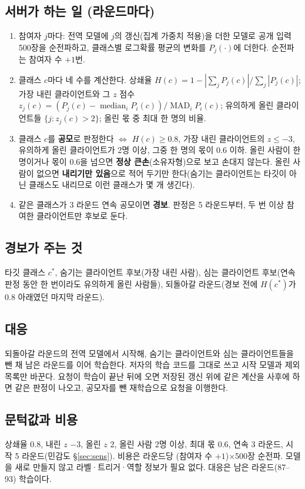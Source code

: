 \documentclass[10pt,a4paper]{article}
\begin{document}
\subsection{서버가 하는 일 (라운드마다)}
\begin{enumerate}
\item 참여자 $j$마다: 전역 모델에 $j$의 갱신(집계 가중치 적용)을 더한 모델로 공개 입력 500장을 순전파하고, 클래스별 로그확률 평균의 변화를 $P_j(\cdot)$에 더한다. 순전파는 참여자 수 $+1$번.
\item 클래스 $c$마다 네 수를 계산한다. 상쇄율 $H(c)=1-|\sum_jP_j(c)|/\sum_j|P_j(c)|$; 가장 내린 클라이언트와 그 $z$ 점수 $z_j(c)=(P_j(c)-\operatorname{median}_iP_i(c))/\operatorname{MAD}_iP_i(c)$; 유의하게 올린 클라이언트들 $\{j: z_j(c)>2\}$; 올린 몫 중 최대 한 명의 비율.
\item 클래스 $c$를 \textbf{공모}로 판정한다 $\Leftrightarrow$ $H(c)\ge0.8$, 가장 내린 클라이언트의 $z\le-3$, 유의하게 올린 클라이언트가 2명 이상, 그중 한 명의 몫이 0.6 이하. 올린 사람이 한 명이거나 몫이 0.6을 넘으면 \textbf{정상 큰손}(소유자형)으로 보고 손대지 않는다. 올린 사람이 없으면 \textbf{내리기만 있음}으로 적어 두기만 한다(숨기는 클라이언트는 타깃이 아닌 클래스도 내리므로 이런 클래스가 몇 개 생긴다).
\item 같은 클래스가 3 라운드 연속 공모이면 \textbf{경보}. 판정은 5 라운드부터, 두 번 이상 참여한 클라이언트만 후보로 둔다.
\end{enumerate}
\subsection{경보가 주는 것}
타깃 클래스 $c^*$, 숨기는 클라이언트 후보(가장 내린 사람), 심는 클라이언트 후보(연속 판정 동안 한 번이라도 유의하게 올린 사람들), 되돌아갈 라운드(경보 전에 $H(c^*)$가 0.8 아래였던 마지막 라운드).
\subsection{대응}
되돌아갈 라운드의 전역 모델에서 시작해, 숨기는 클라이언트와 심는 클라이언트들을 뺀 채 남은 라운드를 이어 학습한다. 저자의 학습 코드를 그대로 쓰고 시작 모델과 제외 목록만 바꾼다. 요청이 학습이 끝난 뒤에 오면 저장된 갱신 위에 같은 계산을 사후에 하면 같은 판정이 나오고, 공모자를 뺀 재학습으로 요청을 이행한다.
\subsection{문턱값과 비용}
상쇄율 0.8, 내린 $z$ $-3$, 올린 $z$ 2, 올린 사람 2명 이상, 최대 몫 0.6, 연속 3 라운드, 시작 5 라운드(민감도 \S\ref{sec:sens}). 비용은 라운드당 (참여자 수 $+1$)$\times$500장 순전파. 모델을 새로 만들지 않고 라벨·트리거·역할 정보가 필요 없다. 대응은 남은 라운드(87--93) 학습이다.
\end{document}
